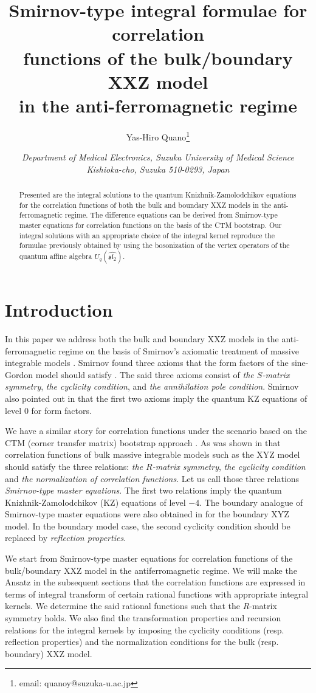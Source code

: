 \documentclass[a4paper,10pt]{article}
\title{Smirnov-type integral formulae for 
correlation \\ functions of 
the bulk/boundary XXZ model \\ in the 
anti-ferromagnetic regime}
\author{Yas-Hiro Quano\thanks
{email: quanoy@suzuka-u.ac.jp}}
\date{\it Department of Medical Electronics, 
Suzuka University of Medical Science \\
      \it Kishioka-cho, Suzuka 510-0293, Japan}
\begin{document}
\maketitle
\begin{abstract}
Presented are the integral solutions to the quantum 
Knizhnik-Zamolodchikov equations for the 
correlation functions of both the bulk and boundary XXZ 
models in the anti-ferromagnetic regime. 
The difference equations can be derived from 
Smirnov-type master equations for correlation functions 
on the basis of the CTM bootstrap. Our integral solutions 
with an appropriate choice of the integral kernel reproduce 
the formulae previously obtained by using the bosonization 
of the vertex operators of the quantum affine algebra 
$U_q (\widehat{\mathfrak{sl}_2})$. 
\end{abstract}

\section{Introduction}

In this paper we address both the bulk and boundary XXZ 
models in the anti-ferromagnetic regime on the basis of 
Smirnov's axiomatic treatment of massive integrable 
models \cite{Smbk}. Smirnov found three axioms that 
the form factors of the sine-Gordon model should 
satisfy \cite{Smbk}. The said three axioms consist 
of {\it the $S$-matrix symmetry}, 
{\it the cyclicity condition}, and 
{\it the annihilation pole condition}. 
Smirnov also pointed out in \cite{Sm1} 
that the first two axioms imply the quantum 
KZ equations \cite{FR} of level $0$ for form factors. 

We have a similar story for correlation functions 
under the scenario based on the CTM (corner transfer 
matrix) bootstrap approach \cite{ESM}. 
As was shown in \cite{JMN} that correlation 
functions of bulk massive integrable models such as 
the XYZ model should satisfy the three relations: 
{\it the $R$-matrix symmetry}, 
{\it the cyclicity condition} and 
{\it the normalization of correlation functions}. 
Let us call those three relations 
{\it Smirnov-type master equations}. 
The first two relations imply the quantum 
Knizhnik-Zamolodchikov (KZ) equations \cite{FR} of 
level $-4$. The boundary analogue of Smirnov-type 
master equations were also obtained in \cite{JKKMW} 
for the boundary XYZ model. 
In the boundary model case, the second cyclicity condition 
should be replaced by {\it reflection properties}. 

We start from Smirnov-type master equations for 
correlation functions of the bulk/boundary XXZ model in 
the antiferromagnetic regime. We will make the Ansatz in 
the subsequent sections that the correlation functions 
are expressed in terms of integral transform of certain 
rational functions with appropriate integral kernels. 
We determine the said rational functions such that 
the $R$-matrix symmetry holds. We also find the 
transformation properties and recursion relations for 
the integral kernels by imposing the cyclicity conditions 
(resp. reflection properties) and the normalization 
conditions for the bulk (resp. boundary) XXZ model. 
\end{document}
